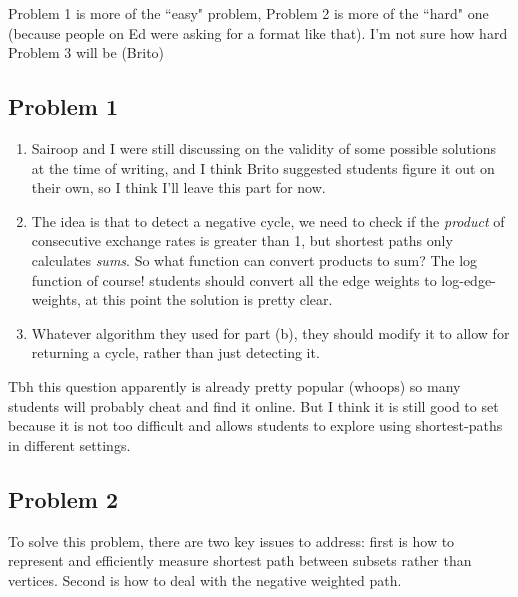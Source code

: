\documentclass{article}
\begin{document}
Problem 1 is more of the ``easy" problem, Problem 2 is more of the ``hard" one (because people on Ed were asking for a format like that). I'm not sure how hard Problem 3 will be (Brito)


\subsection*{Problem 1}
\begin{enumerate}[label = \alph*)]
    \item Sairoop and I were still discussing on the validity of some possible solutions at the time of writing, and I think Brito suggested students figure it out on their own, so I think I'll leave this part for now.
    \item The idea is that to detect a negative cycle, we need to check if the \textit{product} of consecutive exchange rates is greater than 1, but shortest paths only calculates \textit{sums}. So what function can convert products to sum? The log function of course! students should convert all the edge weights to log-edge-weights, at this point the solution is pretty clear.
    \item Whatever algorithm they used for part (b), they should modify it to allow for returning a cycle, rather than just detecting it. 
\end{enumerate}
Tbh this question apparently is already pretty popular (whoops) so many students will probably cheat and find it online. But I think it is still good to set because it is not too difficult and allows students to explore using shortest-paths in different settings.


\subsection*{Problem 2}

\vspace{2mm}
To solve this problem, there are two key issues to address: first is how
to represent and efficiently measure shortest path between subsets rather
than vertices. Second is how to deal with the negative weighted path.
\end{document}
